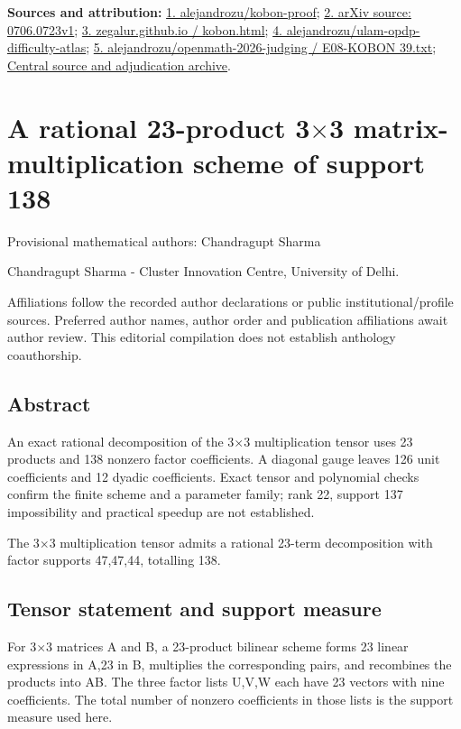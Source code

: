 \documentclass[11pt,a4paper]{article}
\begin{document}
\begin{samepage}
{\small\textbf{Sources and attribution:} \href{https://github.com/alejandrozu/kobon-proof/commit/99fdc8ec1ef8b1fb22c3da32b011b7361762e958}{1. alejandrozu/kobon-proof}; \href{https://arxiv.org/html/0706.0723v1}{2. arXiv source: 0706.0723v1}; \href{https://zegalur.github.io/line-order/gallery/kobon.html}{3. zegalur.github.io / kobon.html}; \href{https://github.com/alejandrozu/ulam-opdp-difficulty-atlas}{4. alejandrozu/ulam-opdp-difficulty-atlas}; \href{https://github.com/alejandrozu/openmath-2026-judging/blob/d0ed487f487fa7ec814ff705ab55249983fe8707/OpenMath-Judging/review/entries/E08-KOBON39.txt}{5. alejandrozu/openmath-2026-judging / E08-KOBON 39.txt}; \href{https://github.com/alejandrozu/openmath-2026-judging}{Central source and adjudication archive}.\par}

\end{samepage}
\clearpage
\section{A rational 23-product 3\ensuremath{\times}3 matrix-multiplication scheme of support 138}
{\small Provisional mathematical authors: Chandragupt Sharma\par}\medskip
{\small Chandragupt Sharma  -  Cluster Innovation Centre, University of Delhi.\par}

{\small Affiliations follow the recorded author declarations or public institutional/profile sources. Preferred author names, author order and publication affiliations await author review. This editorial compilation does not establish anthology coauthorship.\par}

\subsection{Abstract}
An exact rational decomposition of the 3\ensuremath{\times}3 multiplication tensor uses 23 products and 138 nonzero factor coefficients. A diagonal gauge leaves 126 unit coefficients and 12 dyadic coefficients. Exact tensor and polynomial checks confirm the finite scheme and a parameter family; rank 22, support 137 impossibility and practical speedup are not established.

The 3\ensuremath{\times}3 multiplication tensor admits a rational 23-term decomposition with factor supports 47,47,44, totalling 138.

\subsection{Tensor statement and support measure}
For 3\ensuremath{\times}3 matrices A and B, a 23-product bilinear scheme forms 23 linear expressions in A,23 in B, multiplies the corresponding pairs, and recombines the products into AB. The three factor lists U,V,W each have 23 vectors with nine coefficients. The total number of nonzero coefficients in those lists is the support measure used here.
\end{document}

